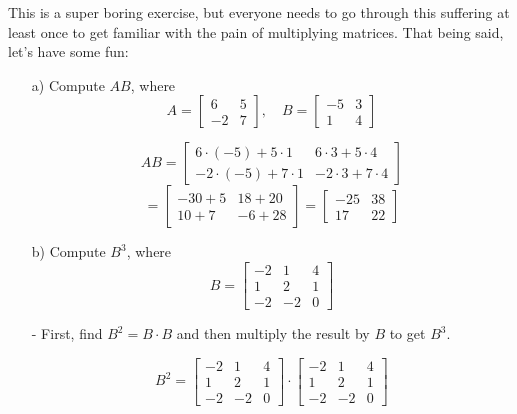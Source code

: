 \begin{sol}
    This is a super boring exercise, but everyone needs to go through this suffering at least once to get familiar with the pain of multiplying matrices. That being said, let's have some fun:
    \begin{enumerate}
        \item[a)] Compute $AB$, where 
        \[
        A = \begin{bmatrix} 6 & 5 \\ -2 & 7 \end{bmatrix}, \quad B = \begin{bmatrix} -5 & 3 \\ 1 & 4 \end{bmatrix}
        \]

          \[
          AB = \begin{bmatrix} 6 \cdot (-5) + 5 \cdot 1 & 6 \cdot 3 + 5 \cdot 4 \\ -2 \cdot (-5) + 7 \cdot 1 & -2 \cdot 3 + 7 \cdot 4 \end{bmatrix}
          \]
          \[
          = \begin{bmatrix} -30 + 5 & 18 + 20 \\ 10 + 7 & -6 + 28 \end{bmatrix} = \begin{bmatrix} -25 & 38 \\ 17 & 22 \end{bmatrix}
          \]

        \item[b)] Compute $B^3$, where 
        \[
        B = \begin{bmatrix} -2 & 1 & 4 \\ 1 & 2 & 1 \\ -2 & -2 & 0 \end{bmatrix}
        \]

        - First, find $B^2 = B \cdot B$ and then multiply the result by $B$ to get $B^3$.
        
        \[
        B^2 = \begin{bmatrix} -2 & 1 & 4 \\ 1 & 2 & 1 \\ -2 & -2 & 0 \end{bmatrix} \cdot \begin{bmatrix} -2 & 1 & 4 \\ 1 & 2 & 1 \\ -2 & -2 & 0 \end{bmatrix}
        \]
        

\end{enumerate}
\end{sol}
